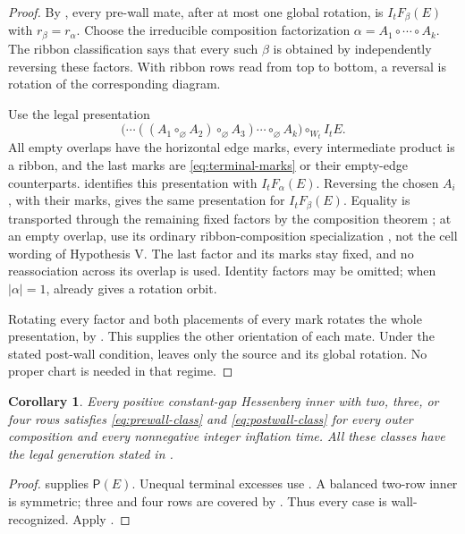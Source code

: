 \documentclass[11pt,a4paper]{amsart}
\numberwithin{equation}{section}
\theoremstyle{plain}
\newtheorem{corollary}[theorem]{Corollary}
\theoremstyle{definition}
\begin{document}
\begin{proof}
By , every pre-wall mate, after at most one global rotation, is \(I_tF_\beta(E)\) with \(r_\beta=r_\alpha\).  Choose the irreducible composition factorization \(\alpha=A_1\circ\cdots\circ A_k\).  The ribbon classification \cite[Thm.~4.1]{Billera2006DecomposableCompositions} says that every such \(\beta\) is obtained by independently reversing these factors.  With ribbon rows read from top to bottom, a reversal is rotation of the corresponding diagram.

Use the legal presentation
\begin{equation}\label{eq:reversal-tower}
 \bigl(\cdots((A_1\circ_{\varnothing}A_2)
       \circ_{\varnothing}A_3)\cdots
       \circ_{\varnothing}A_k\bigr)\circ_{W_t}I_tE.
\end{equation}
All empty overlaps have the horizontal edge marks, every intermediate product is a ribbon, and the last marks are \eqref{eq:terminal-marks} or their empty-edge counterparts.   identifies this presentation with \(I_tF_\alpha(E)\).  Reversing the chosen \(A_i\), with their marks, gives the same presentation for \(I_tF_\beta(E)\).  Equality is transported through the remaining fixed factors by the composition theorem \cite[Thm.~3.31]{McNamara2009Classification}; at an empty overlap, use its ordinary ribbon-composition specialization \cite[Rem.~3.29]{McNamara2009Classification}, not the cell wording of Hypothesis V.  The last factor and its marks stay fixed, and no reassociation across its overlap is used.  Identity factors may be omitted; when \(|\alpha|=1\),  already gives a rotation orbit.

Rotating every factor and both placements of every mark rotates the whole presentation, by \cite[Lem.~3.19(ii)]{McNamara2009Classification}.  This supplies the other orientation of each mate.  Under the stated post-wall condition,  leaves only the source and its global rotation.  No proper chart is needed in that regime.
\end{proof}

\begin{corollary}\label{cor:four-row-inflation}
Every positive constant-gap Hessenberg inner with two, three, or four rows satisfies \eqref{eq:prewall-class} and \eqref{eq:postwall-class} for every outer composition and every nonnegative integer inflation time.  All these classes have the legal generation stated in .
\end{corollary}
\begin{proof}
 supplies \(\mathsf P(E)\).  Unequal terminal excesses use .  A balanced two-row inner is symmetric; three and four rows are covered by .  Thus every case is wall-recognized.  Apply .
\end{proof}
\end{document}
